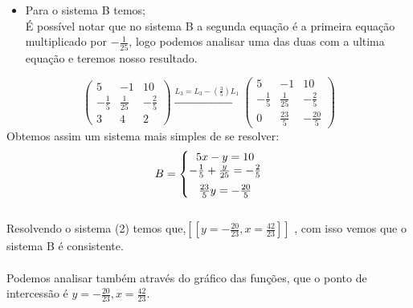 \documentclass{article}
\begin{document}
      \begin{itemize}
          \item Para o sistema B temos;\\               
          É possível notar que no sistema B a segunda equação é a primeira equação multiplicado por $ -\frac{1}{25}$, logo podemos analisar uma das duas com a ultima equação e teremos nosso resultado. 
          
      \end{itemize}
      \begin{equation*}
      \begin{pmatrix} 5 &-1  &10 \\-\frac{1}{5}& \frac{1}{25} & -\frac{2}{5} \\ 3 & 4 & 2 \end{pmatrix}
      \xrightarrow[]{L_3=L_3-(\frac{3}{5})L_1}
      \begin{pmatrix} 5 &-1  &10 \\-\frac{1}{5}& \frac{1}{25} & -\frac{2}{5} \\ 0 & \frac{23}{5} & -\frac{20}{5} \end{pmatrix}
      \end{equation*}
      Obtemos assim um sistema mais simples de se resolver:
      \begin{equation}
        B = \left\{\begin{matrix} 5x - y = 10 \\ \medskip -\frac{1}{5} + \frac{y}{25} = -\frac{2}{5} \\  \frac{23}{5}y= -\frac{20}{5} \end{matrix}\right.
      \end{equation}
       \\ 
       Resolvendo o sistema (2) temos que,$\left [ \left [ y=-\frac{20}{23}  , x=\frac{42}{23}  \right ] \right ]$ , com isso vemos que o sistema B é consistente.\bigskip
    \\ \\ Podemos analisar também através do gráfico das funções, que o ponto de intercessão é $ y=-\frac{20}{23}  , x=\frac{42}{23} $.
    
    \begin{center}
    \end{center}
\end{document}
